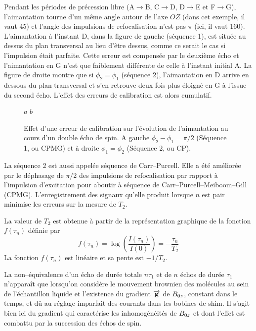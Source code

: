 Pendant les périodes de précession libre (A$\rightarrow$B, C$\rightarrow$D,
D$\rightarrow$E et F$\rightarrow$G), l'aimantation tourne d'un même angle 
autour de l'axe $OZ$ (dans cet exemple, il vaut 45\degres) et l'angle des
impulsions de refocalisation n'est pas $\pi$ (ici, il vaut 160\degres).
L'aimantation à l'instant D, dans la figure de gauche (séquence 1), 
est située au dessus du plan transversal au lieu d'être dessus,
comme ce serait le cas si l'impulsion était parfaite.
Cette erreur est compensée par le deuxième écho et l'aimantation en G
n'est que faiblement différente de celle à l'instant initial A.
La figure de droite montre que si $\phi_2 = \phi_1$ (séquence 2), l'aimantation
en D arrive en dessous du plan transversal et
s'en retrouve deux fois plus éloigné en G à l'issue du second écho.
L'effet des erreurs de calibration est alors cumulatif.

\begin{figure}[hbt]
\begin{center}
$a$
\hspace{1em}
$b$
\end{center}
\caption[Séquence CPMG]{Effet d'une erreur de calibration sur l'évolution de
l'aimantation au cours d'un double écho de spin.
A gauche $\phi_2 - \phi_1 = \pi/2$ (Séquence 1, ou CPMG) 
et à droite $\phi_1 = \phi_2$ (Séquence 2, ou CP).}
\label{fig:cpmgcalib}
\end{figure}

La séquence 2 est aussi appelée séquence de Carr--Purcell.
Elle a été améliorée
par le déphasage de $\pi/2$ des impulsions de refocalisation par rapport à
l'impulsion d'excitation pour aboutir à séquence de Carr--Purcell--Meiboom--Gill
(CPMG).
L'enregistrement des signaux qu'elle produit lorsque $n$ est pair minimise
les erreurs sur la mesure de $T_2$.

La valeur de $T_2$ est obtenue à partir de la représentation graphique
de la fonction $f(\tau_n)$ définie par
\begin{equation}
f(\tau_n) = \log\left(\frac{I(\tau_n)}{I(0)}\right) = -\frac{\tau_n}{T_2}
\end{equation}
La fonction $f(\tau_n)$ est linéaire et sa pente est $-1/T_2$.

La non--équivalence d'un écho de durée totale $n\tau_1$ et de $n$ échos
de durée $\tau_1$ n'apparaît que lorsqu'on considère le mouvement
brownien des molécules au sein de l'échantillon liquide et l'existence
du gradient $\overrightarrow{\mathbf{g}}$ de $B_{0z}$, constant dans le temps, et dû au réglage imparfait
des courants dans les bobines de shim.
Il s'agit bien ici du gradient qui caractérise les inhomogénéités de $B_{0z}$ et
dont l'effet est combattu par la succession des échos de spin.

